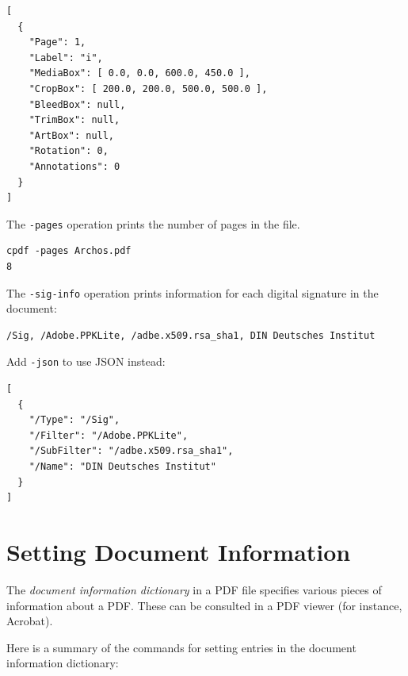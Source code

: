 \documentclass{book}
\begin{document}
\begin{framed}
{\small\begin{verbatim}
[
  {
    "Page": 1,
    "Label": "i",
    "MediaBox": [ 0.0, 0.0, 600.0, 450.0 ],
    "CropBox": [ 200.0, 200.0, 500.0, 500.0 ],
    "BleedBox": null,
    "TrimBox": null,
    "ArtBox": null,
    "Rotation": 0,
    "Annotations": 0
  }
]
\end{verbatim}}
\end{framed}

\noindent The \texttt{-pages} operation prints the number of pages in the file.

\begin{framed}
{\small\begin{verbatim}
cpdf -pages Archos.pdf
8
\end{verbatim}}
\end{framed}

\noindent The \texttt{-sig-info} operation prints information for each digital signature in the document:

\begin{framed}
{\small\begin{verbatim}
/Sig, /Adobe.PPKLite, /adbe.x509.rsa_sha1, DIN Deutsches Institut
\end{verbatim}}
\end{framed}

\noindent Add \texttt{-json} to use JSON instead:

\begin{framed}
{\small\begin{verbatim}
[
  {
    "/Type": "/Sig",
    "/Filter": "/Adobe.PPKLite",
    "/SubFilter": "/adbe.x509.rsa_sha1",
    "/Name": "DIN Deutsches Institut"
  }
]
\end{verbatim}}
\end{framed}

\section{Setting Document Information}
\label{setdocinfo}
  The \textit{document information dictionary} in a PDF file specifies various
pieces of information about a PDF. These can be consulted in a PDF viewer (for
instance, Acrobat).

  Here is a summary of the commands for setting entries in the document
information dictionary:
\end{document}
